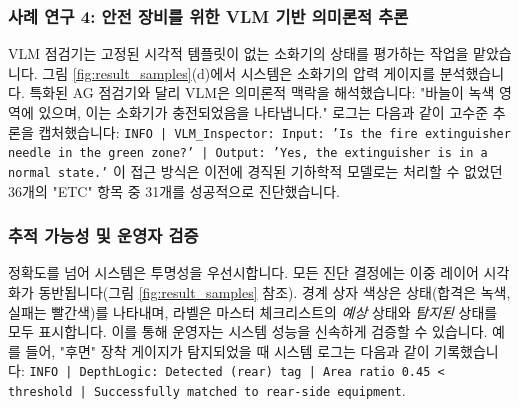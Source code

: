 \subsubsection{사례 연구 4: 안전 장비를 위한 VLM 기반 의미론적 추론}
VLM 점검기는 고정된 시각적 템플릿이 없는 소화기의 상태를 평가하는 작업을 맡았습니다.
그림 \ref{fig:result_samples}(d)에서 시스템은 소화기의 압력 게이지를 분석했습니다.
특화된 AG 점검기와 달리 VLM은 의미론적 맥락을 해석했습니다: "바늘이 녹색 영역에 있으며, 이는 소화기가 충전되었음을 나타냅니다."
로그는 다음과 같이 고수준 추론을 캡처했습니다: \texttt{INFO | VLM_Inspector: Input: 'Is the fire extinguisher needle in the green zone?' | Output: 'Yes, the extinguisher is in a normal state.'}
이 접근 방식은 이전에 경직된 기하학적 모델로는 처리할 수 없었던 36개의 "ETC" 항목 중 31개를 성공적으로 진단했습니다.

\subsubsection{추적 가능성 및 운영자 검증}
정확도를 넘어 시스템은 투명성을 우선시합니다.
모든 진단 결정에는 이중 레이어 시각화가 동반됩니다(그림 \ref{fig:result_samples} 참조).
경계 상자 색상은 상태(합격은 녹색, 실패는 빨간색)를 나타내며, 라벨은 마스터 체크리스트의 \textit{예상} 상태와 \textit{탐지된} 상태를 모두 표시합니다.
이를 통해 운영자는 시스템 성능을 신속하게 검증할 수 있습니다.
예를 들어, "후면" 장착 게이지가 탐지되었을 때 시스템 로그는 다음과 같이 기록했습니다: \texttt{INFO | DepthLogic: Detected (rear) tag | Area ratio 0.45 < threshold | Successfully matched to rear-side equipment}.

